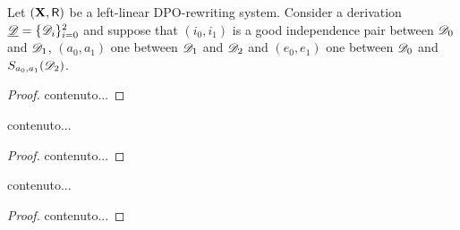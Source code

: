 \begin{lemma}\label{lem:primo}
Let $(\textbf {\textup{X}},\mathsf{R})$ be a left-linear DPO-rewriting system. Consider a derivation $\underline{\mathscr{D}}=\{\mathscr{D}_i\}_{i=0}^2$ and suppose that $(i_0,i_1)$ is a good independence pair between $\mathscr{D}_0$ and $\mathscr{D}_1$, $(a_0,a_1)$ one between $\mathscr{D}_1$ and $\mathscr{D}_2$ and $(e_0, e_1)$ one between $\mathscr{D}_0$ and $S_{a_0,a_1}(\mathscr{D}_2)$.
\end{lemma}
\begin{proof}
	contenuto...
\end{proof}


\begin{lemma}\label{lem:secondo}
	contenuto...
\end{lemma}
\begin{proof}
	contenuto...
\end{proof}



\begin{lemma}\label{lem:terzo}
	contenuto...
\end{lemma}
\begin{proof}
	contenuto...
\end{proof}


